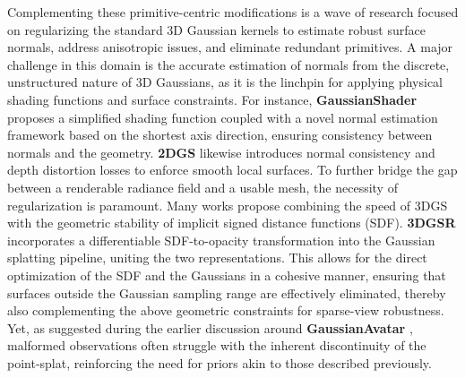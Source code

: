 \documentclass[11pt,a4paper]{article}
\begin{document}
Complementing these primitive-centric modifications is a wave of research focused on regularizing the standard 3D Gaussian kernels to estimate robust surface normals, address anisotropic issues, and eliminate redundant primitives. A major challenge in this domain is the accurate estimation of normals from the discrete, unstructured nature of 3D Gaussians, as it is the linchpin for applying physical shading functions and surface constraints. For instance, \textbf{GaussianShader} \cite{arxiv:2311.17977v1} proposes a simplified shading function coupled with a novel normal estimation framework based on the shortest axis direction, ensuring consistency between normals and the geometry. \textbf{2DGS} \cite{arxiv:2403.17888v1} likewise introduces normal consistency and depth distortion losses to enforce smooth local surfaces. To further bridge the gap between a renderable radiance field and a usable mesh, the necessity of regularization is paramount. Many works propose combining the speed of 3DGS with the geometric stability of implicit signed distance functions (SDF). \textbf{3DGSR} \cite{arxiv:2404.00409v1} incorporates a differentiable SDF-to-opacity transformation into the Gaussian splatting pipeline, uniting the two representations. This allows for the direct optimization of the SDF and the Gaussians in a cohesive manner, ensuring that surfaces outside the Gaussian sampling range are effectively eliminated, thereby also complementing the above geometric constraints for sparse-view robustness. Yet, as suggested during the earlier discussion around \textbf{GaussianAvatar} \cite{arxiv:2312.02134v3}, malformed observations often struggle with the inherent discontinuity of the point-splat, reinforcing the need for priors akin to those described previously.
\end{document}
